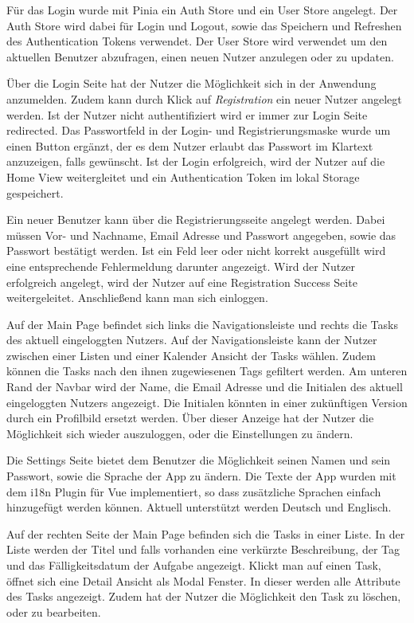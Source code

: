 \documentclass[a4paper, 12pt]{article}
\begin{document}
    Für das Login wurde mit Pinia ein Auth Store und ein User Store angelegt. Der Auth Store wird dabei für Login und
    Logout, sowie das Speichern und Refreshen des Authentication Tokens verwendet. Der User Store wird verwendet um den
    aktuellen Benutzer abzufragen, einen neuen Nutzer anzulegen oder zu updaten.
    
    Über die Login Seite hat der Nutzer die Möglichkeit sich in der Anwendung anzumelden. Zudem kann durch Klick auf
    {\it Registration} ein neuer Nutzer angelegt werden. Ist der Nutzer nicht authentifiziert wird er immer zur Login
    Seite redirected. Das Passwortfeld in der Login- und Registrierungsmaske wurde um einen Button ergänzt, der es dem
    Nutzer erlaubt das Passwort im Klartext anzuzeigen, falls gewünscht. Ist der Login erfolgreich, wird der Nutzer auf
    die Home View weitergleitet und ein Authentication Token im lokal Storage gespeichert.

    Ein neuer Benutzer kann über die Registrierungsseite angelegt werden. Dabei müssen Vor- und Nachname, Email Adresse
    und Passwort angegeben, sowie das Passwort bestätigt werden. Ist ein Feld leer oder nicht korrekt ausgefüllt wird
    eine entsprechende Fehlermeldung darunter angezeigt. Wird der Nutzer erfolgreich angelegt, wird der Nutzer auf eine
    Registration Success Seite weitergeleitet. Anschließend kann man sich einloggen.

    Auf der Main Page befindet sich links die Navigationsleiste und rechts die Tasks des aktuell eingeloggten Nutzers.
    Auf der Navigationsleiste kann der Nutzer zwischen einer Listen und einer Kalender Ansicht der Tasks wählen. Zudem
    können die Tasks nach den ihnen zugewiesenen Tags gefiltert werden. Am unteren Rand der Navbar wird der Name, die
    Email Adresse und die Initialen des aktuell eingeloggten Nutzers angezeigt. Die Initialen könnten in einer
    zukünftigen Version durch ein Profilbild ersetzt werden. Über dieser Anzeige hat der Nutzer die Möglichkeit sich
    wieder auszuloggen, oder die Einstellungen zu ändern.

    Die Settings Seite bietet dem Benutzer die Möglichkeit seinen Namen und sein Passwort, sowie die Sprache der App zu
    ändern. Die Texte der App wurden mit dem i18n Plugin für Vue implementiert, so dass zusätzliche Sprachen einfach
    hinzugefügt werden können. Aktuell unterstützt werden Deutsch und Englisch.

    Auf der rechten Seite der Main Page befinden sich die Tasks in einer Liste. In der Liste werden der Titel und falls
    vorhanden eine verkürzte Beschreibung, der Tag und das Fälligkeitsdatum der Aufgabe angezeigt. Klickt man auf einen
    Task, öffnet sich eine Detail Ansicht als Modal Fenster. In dieser werden alle Attribute des Tasks angezeigt. Zudem
    hat der Nutzer die Möglichkeit den Task zu löschen, oder zu bearbeiten.
\end{document}
